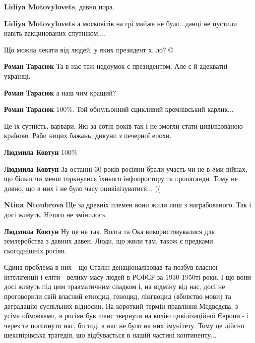 \begin{itemize}
\begin{itemize}
\textbf{Lidiya Motovylovets}, давно пора.

\textbf{Lidiya Motovylovets} а московітів на грі майже не було...данці не пустили навіть вакцинованих спутніком....
\end{itemize}

Що можна чекати від людей, у яких президент х..ло? ©

\textbf{Роман Тарасюк} Та в нас теж недоумок є президентом. Але є й адекватні українці.

\textbf{Роман Тарасюк} а наш чим кращий?

\textbf{Роман Тарасюк} 100\%. Той обнульонний сцикливий кремлівський карлик...


Це їх сутність, варвари. Які за сотні років так і не змогли стати цивілізованою
країною. Раби ницих бажань, дикуни з печерної епохи.

\textbf{Людмила Ковтун} 100\%


\textbf{Людмила Ковтун} За останні 30 років росіяни брали участь чи не в 8ми
війнах, що більш чи менш торкнулися їхнього інфопростору та пропаганди. Тому не
дивно, що в них і не було часу оцивілізуватися... ((

\begin{itemize}
\textbf{Ntina Ntoubrova} Ще за древніх племен вони жили лиш з награбованого.
Так і досі живуть. Нічого не змінилось.


\textbf{Людмила Ковтун} Ну це не так. Волга та Ока використовувалися для землеробства з
давних давен. Люди, що жили там, також є предками сьогоднішніх росіян.

Єдина проблема в них - що Сталін денаціоналізовав та позбув власної
інтелігенції і еліти - велику масу людей в РСФСР за 1930-1950ті роки. І що вони
досі живуть під цим травматичним спадком і, на відміну від нас, досі не
проговорили свій власний етноцид, геноцид, лінгвоцид (вбивство мови) та
деградацію суспільних відносин. На короткий термін правління Мєдвєдєва, з усіма
обмовками, в росіян був шанс звернути на колію цивілізаційної Європи - і через
те поглинути нас, бо тоді в нас не було на них імунітету. Тому це дійсно
шекспірівська трагедія, що відбувається в нашій частині континенту... 🤔


\end{itemize}
\end{itemize}
